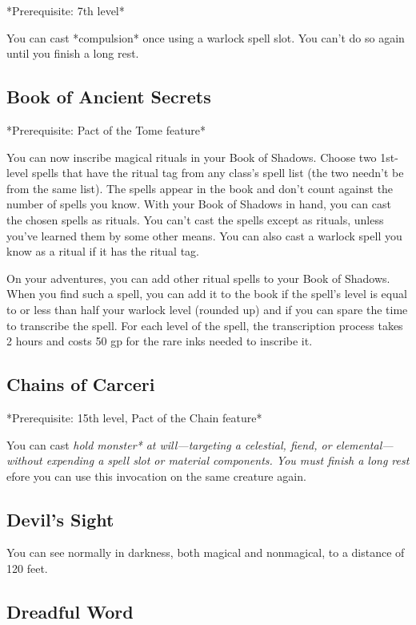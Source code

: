 *Prerequisite: 7th level*

You can cast *compulsion* once using a warlock spell slot. You can’t do so again until you finish a long rest.

\subsection{Book of Ancient Secrets}

*Prerequisite: Pact of the Tome feature*

You can now inscribe magical rituals in your Book of Shadows. Choose two 1st-level spells that have the ritual tag from any class’s spell list (the two needn’t be from the same list). The spells appear in the book and don’t count against the number of spells you know. With your Book of Shadows in hand, you can cast the chosen spells as rituals. You can’t cast the spells except as rituals, unless you’ve learned them by some other means. You can also cast a warlock spell you know as a ritual if it has the ritual tag.

On your adventures, you can add other ritual spells to your Book of Shadows. When you find such a spell, you can add it to the book if the spell’s level is equal to or less than half your warlock level (rounded up) and if you can spare the time to transcribe the spell. For each level of the spell, the transcription process takes 2 hours and costs 50 gp for the rare inks needed to inscribe it.

\subsection{Chains of Carceri}

*Prerequisite: 15th level, Pact of the Chain feature*

You can cast \textit{hold monster* at will—targeting a celestial, fiend, or elemental—without expending a spell slot or material components. You must finish a long rest }efore you can use this invocation on the same creature again.

\subsection{Devil’s Sight}

You can see normally in darkness, both magical and nonmagical, to a distance of 120 feet.

\subsection{Dreadful Word}

